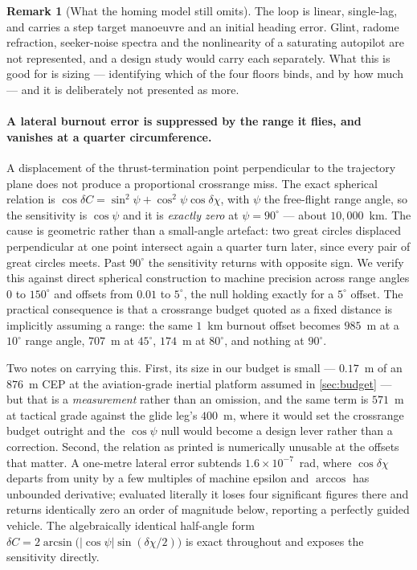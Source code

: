 \documentclass[11pt,a4paper]{article}
\theoremstyle{definition}
\newtheorem{remark}[theorem]{Remark}
\numberwithin{equation}{section}
\begin{document}
\begin{remark}[What the homing model still omits]
The loop is linear, single-lag, and carries a step target manoeuvre and an initial heading error. Glint, radome refraction, seeker-noise spectra and the nonlinearity of a saturating autopilot are not represented, and a design study would carry each separately. What this is good for is sizing --- identifying which of the four floors binds, and by how much --- and it is deliberately not presented as more.
\end{remark}

\paragraph{A lateral burnout error is suppressed by the range it flies, and vanishes at a quarter circumference.} A displacement of the thrust-termination point perpendicular to the trajectory plane does not produce a proportional crossrange miss. The exact spherical relation \cite[Eq.~(6.116a)]{siouris2004} is $\cos \delta C = \sin^2\psi + \cos^2\psi \cos \delta\chi$, with $\psi$ the free-flight range angle, so the sensitivity is $\cos\psi$ and it is \emph{exactly zero} at $\psi = 90^\circ$ --- about $10{,}000$~km. The cause is geometric rather than a small-angle artefact: two great circles displaced perpendicular at one point intersect again a quarter turn later, since every pair of great circles meets. Past $90^\circ$ the sensitivity returns with opposite sign. We verify this against direct spherical construction to machine precision across range angles $0$ to $150^\circ$ and offsets from $0.01$ to $5^\circ$, the null holding exactly for a $5^\circ$ offset. The practical consequence is that a crossrange budget quoted as a fixed distance is implicitly assuming a range: the same $1$~km burnout offset becomes $985$~m at a $10^\circ$ range angle, $707$~m at $45^\circ$, $174$~m at $80^\circ$, and nothing at $90^\circ$.

Two notes on carrying this. First, its size in our budget is small --- $0.17$~m of an $876$~m CEP at the aviation-grade inertial platform assumed in \cref{sec:budget} --- but that is a \emph{measurement} rather than an omission, and the same term is $571$~m at tactical grade against the glide leg's $400$~m, where it would set the crossrange budget outright and the $\cos\psi$ null would become a design lever rather than a correction. Second, the relation as printed is numerically unusable at the offsets that matter. A one-metre lateral error subtends $1.6\times10^{-7}$~rad, where $\cos\delta\chi$ departs from unity by a few multiples of machine epsilon and $\arccos$ has unbounded derivative; evaluated literally it loses four significant figures there and returns identically zero an order of magnitude below, reporting a perfectly guided vehicle. The algebraically identical half-angle form $\delta C = 2\arcsin\!\big(|\cos\psi|\sin(\delta\chi/2)\big)$ is exact throughout and exposes the sensitivity directly.
\end{document}
